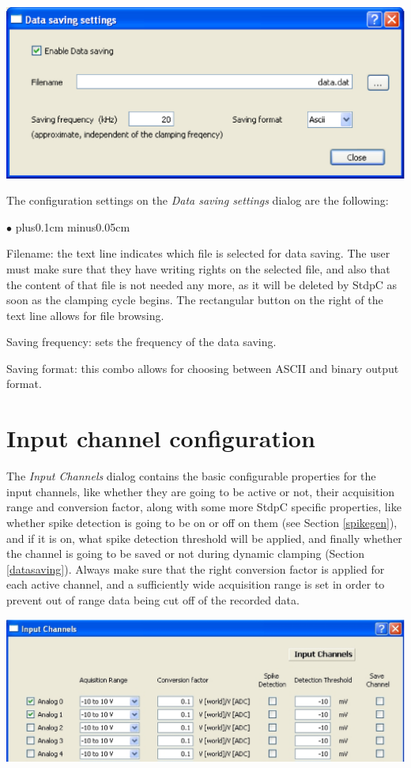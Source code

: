\documentclass{article}
\newenvironment{myitem}{\begin{list}{$\bullet$}{\setlength{\leftmargin}{1.1em}
\itemsep0.1cm plus0.1cm minus0.05cm
\listparindent0cm
\addtolength{\labelsep}{0.5\labelsep}
\setlength{\labelwidth}{0.8em}
\setlength{\leftmargin}{\labelwidth}
\addtolength{\leftmargin}{\labelsep}
}}{\end{list}}
\begin{document}
\includegraphics[scale=0.6]{dataSavingDialog}

The configuration settings on the \emph{Data saving settings} dialog are
the following:
\begin{myitem}
\item Filename: the text line indicates which file is selected for data
  saving. The user must make sure that they have writing rights on the
  selected file, and also that the content of that file is not needed any
  more, as it will be deleted by StdpC as soon as the clamping cycle
  begins. The rectangular button on the right of the text line allows for
  file browsing.
\item Saving frequency: sets the frequency of the data saving.
\item Saving format: this combo allows for choosing between ASCII and
  binary output format.
\end{myitem}


\section{Input channel configuration} \label{inchnconfig}

The \emph{Input Channels} dialog contains the basic configurable properties
for the input channels, like whether they are going to be active or not,
their acquisition range and conversion factor, along with some more StdpC specific
properties, like whether spike detection is going to be on or
off on them (see Section \ref{spikegen}), and if it is on, what spike
detection threshold will be applied, and finally whether the channel is
going to be saved or not during dynamic clamping (Section \ref{datasaving}). Always make sure that the
right conversion factor is applied for each active channel, and a
sufficiently wide acquisition range is set in order to prevent out of range
data being cut off of the recorded data.

\includegraphics[scale=0.6]{inputChnDialog}
\end{document}
